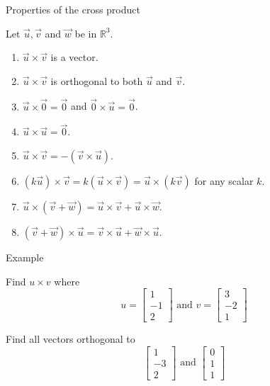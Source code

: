 \documentclass{beamer}
\begin{document}
\begin{frame}{Properties of the cross product}
\begin{theorem}
Let $\vec{u}, \vec{v}$ and $\vec{w}$ be in $\mathbb{R}^3$.
\begin{enumerate}
\item $\vec{u}\times\vec{v}$ is a vector.
\item $\vec{u}\times\vec{v}$ is orthogonal to both $\vec{u}$ and $\vec{v}$.
\item $\vec{u}\times\vec{0}=\vec{0}$ and
$\vec{0}\times\vec{u}=\vec{0}$.
\item $\vec{u}\times\vec{u}=\vec{0}$.
\item $\vec{u}\times\vec{v} = - (\vec{v}\times\vec{u})$.
\item $(k\vec{u})\times\vec{v}
= k(\vec{u}\times\vec{v})
=\vec{u}\times(k\vec{v})$ for any scalar $k$.
\item $\vec{u}\times(\vec{v} + \vec{w}) =
\vec{u}\times\vec{v} + \vec{u}\times\vec{w}$.
\item $(\vec{v} + \vec{w})\times\vec{u}=
\vec{v}\times\vec{u} + \vec{w}\times\vec{u}$.
\end{enumerate}
\end{theorem}
\end{frame}

\begin{frame}{Example}
\begin{example}
  Find $u\times v$ where
  \begin{equation*}
  u= \left[
  \begin{array}{c}
  1\\
  -1\\
  2
  \end{array}
  \right]\text{ and } v = \left[
  \begin{array}{c}
  3\\
  -2\\
  1
  \end{array}
  \right]
  \end{equation*}
\end{example}
\begin{example}
Find all vectors orthogonal to 
\begin{equation*}
\left[
\begin{array}{c}
1\\
-3\\
2
\end{array}
\right]\text{ and } \left[
\begin{array}{c}
0\\
1\\
1
\end{array}
\right]
\end{equation*}
\end{example}
\end{frame}
\end{document}
